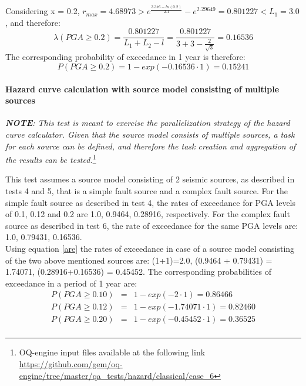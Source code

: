 Considering x = 0.2, $r_{max} = 4.68973 > e^{\frac{3.376 - ln(0.2)}{2.1}} - e^{2.29649} = 0.801227 < L_{1} = 3.0$, and therefore:
\begin{equation}
\lambda(PGA \geq 0.2) = \frac{0.801227}{L_{1} + L_{2} - l} = \frac{0.801227}{3 + 3 - \frac{2}{\sqrt{3}}} = 0.16536
\end{equation}
The corresponding probability of exceedance in 1 year is therefore:
\begin{equation}
P(PGA \geq 0.2) = 1 - exp(- 0.16536 \cdot 1) = 0.15241
\end{equation}
%
\clearpage
%
\paragraph{Hazard curve calculation with source model consisting of
multiple sources} 

\textit{\textbf{NOTE}: This test is meant to exercise the
    parallelization strategy of the hazard curve calculator. 
    Given that the source model consists of multiple sources, a
    task for each source can be defined, and therefore the task creation and
    aggregation of the results can be tested.}\footnote{
    OQ-engine input files available at the following link
    \url{https://github.com/gem/oq-engine/tree/master/qa_tests/hazard/classical/case_6}}

This test assumes a source model
consisting of 2 seismic sources, as described in tests 4 and 5, that is a simple
fault source and a complex fault source.  For the simple fault source as
described in test 4, the rates of exceedance for PGA levels of 0.1, 0.12 and 0.2
are 1.0, 0.9464, 0.28916, respectively. For the complex fault source as
described in test 6, the rate of exceedance for the same PGA levels are: 1.0,
0.79431, 0.16536.\\ Using equation \ref{are} the rates of exceedance in case of
a source model consisting of the two above mentioned sources are: (1+1)=2.0,
(0.9464 + 0.79431) = 1.74071, (0.28916+0.16536) = 0.45452. The corresponding
probabilities of exceedance in a period of 1 year are:
\begin{eqnarray}
P(PGA \geq 0.10) &=& 1 - exp(- 2 \cdot 1) = 0.86466 \nonumber \\
P(PGA \geq 0.12) &=& 1 - exp(- 1.74071 \cdot 1) = 0.82460 \nonumber \\
P(PGA \geq 0.20) &=& 1 - exp(- 0.45452 \cdot 1) = 0.36525 \nonumber \\
\end{eqnarray}
%
\clearpage
%
